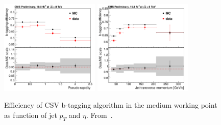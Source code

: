 \begin{figure}[!Hhtbp]
  \begin{center}
    \includegraphics[width=0.42\textwidth]{figs/LTdilep_csvMeffeta.png}
    \includegraphics[width=0.42\textwidth]{figs/LTdilep_csvMeffpt.png}
    \caption{Efficiency of CSV b-tagging algorithm in the medium working point as function of jet $p_{T}$ and $\eta$. From~\cite{CMS-PAS-BTV-13-001}.}
    \label{fig:CSVEff}
  \end{center}
\end{figure}

%
%
%
%
%
